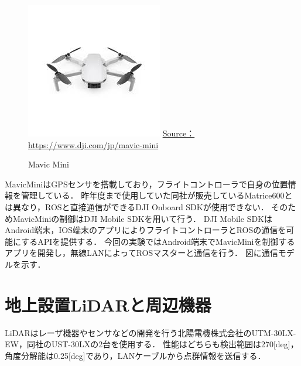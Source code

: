 \documentclass[autodetect-engine,dvipdfmx-if-dvi,ja=standard,a4j,jbase=11pt,magstyle=nomag*]{bxjsreport}
\begin{document}
\begin{figure}[b]
    \centering
    \includegraphics[width=0.9\linewidth, clip]{./figure/chapter4/mavic_mini.jpg}
    \url{Source：https://www.dji.com/jp/mavic-mini}
    \caption{Mavic Mini}
    \label{fig:mavic_mini}
\end{figure}

MavicMiniはGPSセンサを搭載しており，フライトコントローラで自身の位置情報を管理している．
昨年度まで使用していた同社が販売しているMatrice600とは異なり，ROSと直接通信ができるDJI Onboard SDKが使用できない．
そのためMavicMiniの制御はDJI Mobile SDKを用いて行う．
DJI Mobile SDKはAndroid端末，IOS端末のアプリによりフライトコントローラとROSの通信を可能にするAPIを提供する．
今回の実験ではAndroid端末でMavicMiniを制御するアプリを開発し，無線LANによってROSマスターと通信を行う．
図に通信モデルを示す．



\section{地上設置LiDARと周辺機器}
LiDARはレーザ機器やセンサなどの開発を行う北陽電機株式会社のUTM-30LX-EW，同社のUST-30LXの2台を使用する．
性能はどちらも検出範囲は270[deg]，角度分解能は0.25[deg]であり，LANケーブルから点群情報を送信する．
\end{document}
